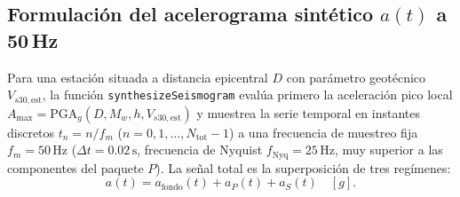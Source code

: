 \documentclass[11pt,a4paper]{article}
\newcommand{\unit}[1]{\mathrm{#1}}
\begin{document}
\subsection{Formulación del acelerograma sintético \texorpdfstring{$a(t)$}{a(t)} a 50\,Hz}
\label{sec:sismo-acelerograma}

Para una estación situada a distancia epicentral $D$ con parámetro geotécnico $V_{s30,\mathrm{est}}$, la función
\texttt{synthesizeSeismogram} evalúa primero la aceleración pico local
$A_{\max} = \mathrm{PGA}_g(D, M_w, h, V_{s30,\mathrm{est}})$ y muestrea la serie temporal en instantes discretos
$t_n = n / f_m$ ($n=0,1,\ldots,N_{\mathrm{tot}}-1$) a una frecuencia de muestreo fija
$f_m = 50\,\unit{Hz}$ ($\Delta t = 0.02\,\unit{s}$, frecuencia de Nyquist $f_{\mathrm{Nyq}} = 25\,\unit{Hz}$,
muy superior a las componentes del paquete $P$). La señal total es la superposición de tres regímenes:
\begin{equation}
  a(t) = a_{\mathrm{fondo}}(t) + a_P(t) + a_S(t)\quad[g].
  \label{eq:acelerograma-total}
\end{equation}
\end{document}
